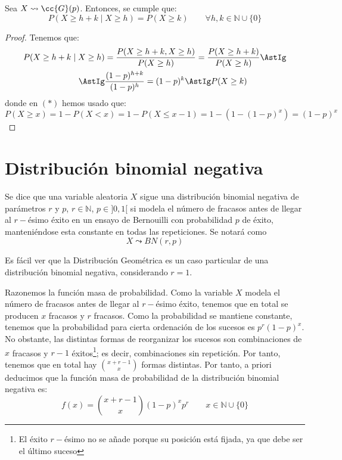 \begin{prop}
    Sea $X\leadsto \cc{G}(p)$. Entonces, se cumple que:
    \begin{equation*}
        P(X\geq h + k \mid X\geq h) = P(X\geq k) \qquad \forall h,k \in \mathbb{N}\cup \{0\}
    \end{equation*}
    \begin{proof}
        Tenemos que:
        \begin{align*}
            P(X\geq h + k \mid X\geq h) &= \frac{P(X\geq h+k, X\geq h)}{P(X\geq h)} = \frac{P(X\geq h+k)}{P(X\geq h)} \AstIg\\
            \AstIg & \dfrac{(1-p)^{h+k}}{(1-p)^h} = (1-p)^k \AstIg P(X\geq k)
        \end{align*}
        donde en $(\ast)$ hemos usado que:
        \begin{equation*}
            P(X\geq x) = 1-P(X<x) = 1-P(X\leq x-1) = 1-(1-(1-p)^x) = (1-p)^x
        \end{equation*}
    \end{proof}
\end{prop}

\section{Distribución binomial negativa}
\begin{definicion}
    Se dice que una variable aleatoria $X$ sigue una distribución binomial negativa de parámetros $r$ y $p$, $r\in \mathbb{N}$, $p\in ]0,1[$ si modela el número de fracasos antes de llegar al $r-$ésimo éxito en un ensayo de Bernouilli con probabilidad $p$ de éxito, manteniéndose esta constante en todas las repeticiones. Se notará como $$X\leadsto BN(r,p)$$
\end{definicion}
\begin{observacion}
    Es fácil ver que la Distribución Geométrica es un caso particular de una distribución binomial negativa, considerando $r=1$.
\end{observacion}

Razonemos la función masa de probabilidad. Como la variable $X$ modela el número de fracasos antes de llegar al $r-$ésimo éxito, tenemos que en total se producen $x$ fracasos y $r$ fracasos. Como la probabilidad se mantiene constante, tenemos que la probabilidad para cierta ordenación de los sucesos es $p^r(1-p)^{x}$. No obstante, las distintas formas de reorganizar los sucesos son combinaciones de $x$ fracasos y $r-1$ éxitos\footnote{El éxito $r-$ésimo no se añade porque su posición está fijada, ya que debe ser el último suceso}; es decir, combinaciones sin repetición. Por tanto, tenemos que en total hay $\binom{x+r-1}{x}$ formas distintas. Por tanto, a priori deducimos que la función masa de probabilidad de la distribución binomial negativa es:
\begin{equation*}
    f(x) = \binom{x+r-1}{x}(1-p)^{x}p^r \qquad x\in \mathbb{N}\cup \{0\}
\end{equation*}

